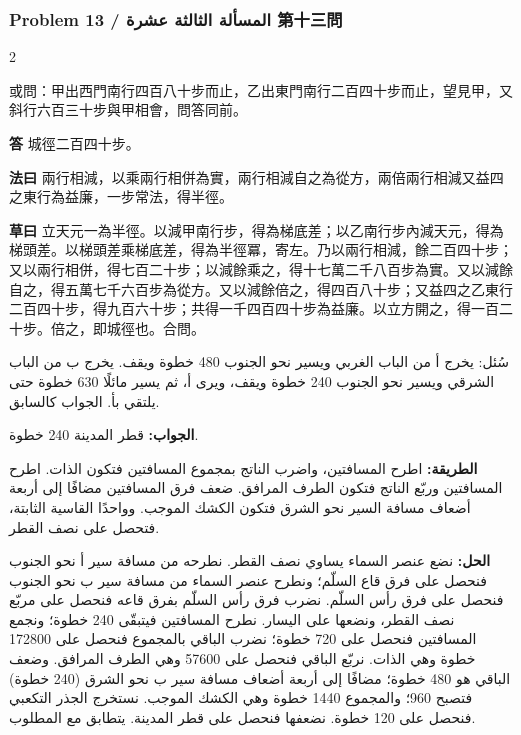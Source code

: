 \documentclass[11pt,a4paper]{article}
\newcommand{\ar}[1]{\arabicfont\beginR #1\endR}
\newcommand{\Answer}[1]{\par\noindent\textbf{\color{problemcolor}答} #1\par}
\newcommand{\Method}[1]{\par\noindent\textbf{\color{problemcolor}法曰} #1\par}
\newcommand{\Workings}[1]{\par\noindent\textbf{\color{problemcolor}草曰} #1\par}
\newcommand{\AnswerAr}{\par\noindent\textbf{\color{problemcolor}\ar{الجواب:}} }
\newcommand{\MethodAr}{\par\noindent\textbf{\color{problemcolor}\ar{الطريقة:}} }
\newcommand{\WorkingsAr}{\par\noindent\textbf{\color{problemcolor}\ar{الحل:}} }
\begin{document}
\vspace{0.5cm}

\subsubsection*{Problem 13 / \ar{المسألة الثالثة عشرة} \quad 第十三問}

\begin{paracol}{2}

\noindent 或問：甲出西門南行四百八十步而止，乙出東門南行二百四十步而止，望見甲，又斜行六百三十步與甲相會，問答同前。

\vspace{0.2cm}

\Answer{城徑二百四十步。}

\vspace{0.2cm}

\Method{兩行相減，以乘兩行相併為實，兩行相減自之為從方，兩倍兩行相減又益四之東行為益廉，一步常法，得半徑。}

\vspace{0.2cm}

\Workings{立天元一為半徑。以減甲南行步，得為梯底差；以乙南行步內減天元，得為梯頭差。以梯頭差乘梯底差，得為半徑冪，寄左。乃以兩行相減，餘二百四十步；又以兩行相併，得七百二十步；以減餘乘之，得十七萬二千八百步為實。又以減餘自之，得五萬七千六百步為從方。又以減餘倍之，得四百八十步；又益四之乙東行二百四十步，得九百六十步；共得一千四百四十步為益廉。以立方開之，得一百二十步。倍之，即城徑也。合問。}

\switchcolumn

\ar{سُئل: يخرج أ من الباب الغربي ويسير نحو الجنوب 480 خطوة ويقف. يخرج ب من الباب الشرقي ويسير نحو الجنوب 240 خطوة ويقف، ويرى أ، ثم يسير مائلًا 630 خطوة حتى يلتقي بأ. الجواب كالسابق.}

\vspace{0.2cm}

\AnswerAr{قطر المدينة 240 خطوة.}

\vspace{0.2cm}

\MethodAr{اطرح المسافتين، واضرب الناتج بمجموع المسافتين فتكون الذات. اطرح المسافتين وربّع الناتج فتكون الطرف المرافق. ضعف فرق المسافتين مضافًا إلى أربعة أضعاف مسافة السير نحو الشرق فتكون الكشك الموجب. وواحدًا القاسية الثابتة، فتحصل على نصف القطر.}

\vspace{0.2cm}

\WorkingsAr{نضع عنصر السماء يساوي نصف القطر. نطرحه من مسافة سير أ نحو الجنوب فنحصل على فرق قاع السلّم؛ ونطرح عنصر السماء من مسافة سير ب نحو الجنوب فنحصل على فرق رأس السلّم. نضرب فرق رأس السلّم بفرق قاعه فنحصل على مربّع نصف القطر، ونضعها على اليسار. نطرح المسافتين فيتبقّى 240 خطوة؛ ونجمع المسافتين فنحصل على 720 خطوة؛ نضرب الباقي بالمجموع فنحصل على 172800 خطوة وهي الذات. نربّع الباقي فنحصل على 57600 وهي الطرف المرافق. وضعف الباقي هو 480 خطوة؛ مضافًا إلى أربعة أضعاف مسافة سير ب نحو الشرق (240 خطوة) فتصبح 960؛ والمجموع 1440 خطوة وهي الكشك الموجب. نستخرج الجذر التكعبي فنحصل على 120 خطوة. نضعفها فنحصل على قطر المدينة. يتطابق مع المطلوب.}

\end{paracol}
\end{document}
